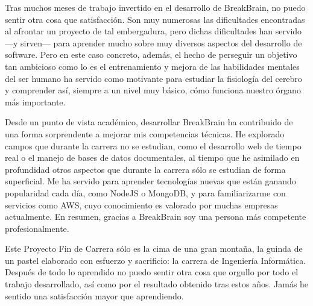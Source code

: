 Tras muchos meses de trabajo invertido en el desarrollo de BreakBrain, no puedo sentir otra cosa que satisfacción. Son muy numerosas las dificultades encontradas al afrontar un proyecto de tal embergadura, pero dichas dificultades han servido ---y sirven--- para aprender mucho sobre muy diversos aspectos del desarrollo de software. Pero en este caso concreto, además, el hecho de perseguir un objetivo tan ambicioso como lo es el entrenamiento y mejora de las habilidades mentales del ser humano ha servido como motivante para estudiar la fisiología del cerebro y comprender así, siempre a un nivel muy básico, cómo funciona nuestro órgano más importante.

Desde un punto de vista académico, desarrollar BreakBrain ha contribuido de una forma sorprendente a mejorar mis competencias técnicas. He explorado campos que durante la carrera no se estudian, como el desarrollo web de tiempo real o el manejo de bases de datos documentales, al tiempo que he asimilado en profundidad otros aspectos que durante la carrera sólo se estudian de forma superficial. Me ha servido para aprender tecnologías nuevas que están ganando popularidad cada día, como NodeJS o MongoDB, y para familiarizarme con servicios como \acf{AWS}, cuyo conocimiento es valorado por muchas empresas actualmente. En resumen, gracias a BreakBrain soy una persona más competente profesionalmente.

Este Proyecto Fin de Carrera sólo es la cima de una gran montaña, la guinda de un pastel elaborado con esfuerzo y sacrificio: la carrera de Ingeniería Informática. Después de todo lo aprendido no puedo sentir otra cosa que orgullo por todo el trabajo desarrollado, así como por el resultado obtenido tras estos años. Jamás he sentido una satisfacción mayor que aprendiendo.




